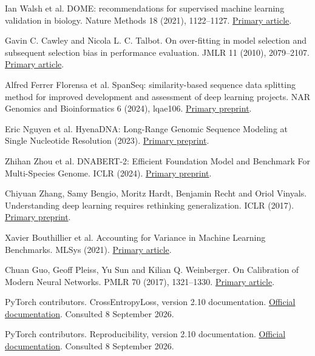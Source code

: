  Ian Walsh et al. DOME: recommendations for supervised machine learning validation in biology. Nature Methods 18 (2021), 1122--1127. \href{https://doi.org/10.1038/s41592-021-01205-4}{Primary article}.

 Gavin C. Cawley and Nicola L. C. Talbot. On over-fitting in model selection and subsequent selection bias in performance evaluation. JMLR 11 (2010), 2079--2107. \href{https://jmlr.org/papers/v11/cawley10a.html}{Primary article}.

 Alfred Ferrer Florensa et al. SpanSeq: similarity-based sequence data splitting method for improved development and assessment of deep learning projects. NAR Genomics and Bioinformatics 6 (2024), lqae106. \href{https://arxiv.org/html/2402.14482v1}{Primary preprint}.

 Eric Nguyen et al. HyenaDNA: Long-Range Genomic Sequence Modeling at Single Nucleotide Resolution (2023). \href{https://arxiv.org/abs/2306.15794}{Primary preprint}.

 Zhihan Zhou et al. DNABERT-2: Efficient Foundation Model and Benchmark For Multi-Species Genome. ICLR (2024). \href{https://arxiv.org/abs/2306.15006}{Primary preprint}.

 Chiyuan Zhang, Samy Bengio, Moritz Hardt, Benjamin Recht and Oriol Vinyals. Understanding deep learning requires rethinking generalization. ICLR (2017). \href{https://arxiv.org/abs/1611.03530v2}{Primary preprint}.

 Xavier Bouthillier et al. Accounting for Variance in Machine Learning Benchmarks. MLSys (2021). \href{https://proceedings.mlsys.org/paper_files/paper/2021/file/0184b0cd3cfb185989f858a1d9f5c1eb-Paper.pdf}{Primary article}.

 Chuan Guo, Geoff Pleiss, Yu Sun and Kilian Q. Weinberger. On Calibration of Modern Neural Networks. PMLR 70 (2017), 1321--1330. \href{https://proceedings.mlr.press/v70/guo17a.html}{Primary article}.

 PyTorch contributors. CrossEntropyLoss, version 2.10 documentation. \href{https://docs.pytorch.org/docs/2.10/generated/torch.nn.CrossEntropyLoss.html}{Official documentation}. Consulted 8 September 2026.

 PyTorch contributors. Reproducibility, version 2.10 documentation. \href{https://docs.pytorch.org/docs/2.10/notes/randomness.html}{Official documentation}. Consulted 8 September 2026.

